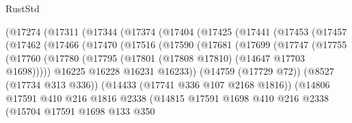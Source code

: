 \begin{lexlean}{RustStd}
\begin{coremodule}
                (@17274
                  (@17311
                    (@17344
                      (@17374
                        (@17404
                          (@17425
                            (@17441
                              (@17453
                                (@17457
                                  (@17462
                                    (@17466
                                      (@17470
                                        (@17516
                                          (@17590
                                            (@17681
                                              (@17699
                                                (@17747
                                                  (@17755
                                                    (@17760
                                                      (@17780
                                                        (@17795
                                                          (@17801
                                                            (@17808 @17810)
                                                            (@14647 @17703 @1698)))))
                                                    @16225
                                                    @16228
                                                    @16231
                                                    @16233))
                                                (@14759 (@17729 @72))
                                                (@8527 (@17734 @313 @336))
                                                (@14433 (@17741 @336 @107 @2168 @1816))
                                                (@14806
                                                  @17591
                                                  @410
                                                  @216
                                                  @1816
                                                  @2338
                                                  (@14815
                                                    @17591
                                                    @1698
                                                    @410
                                                    @216
                                                    @2338
                                                    (@15704
                                                      @17591
                                                      @1698
                                                      @133
                                                      @350

\end{coremodule}
\end{lexlean}
